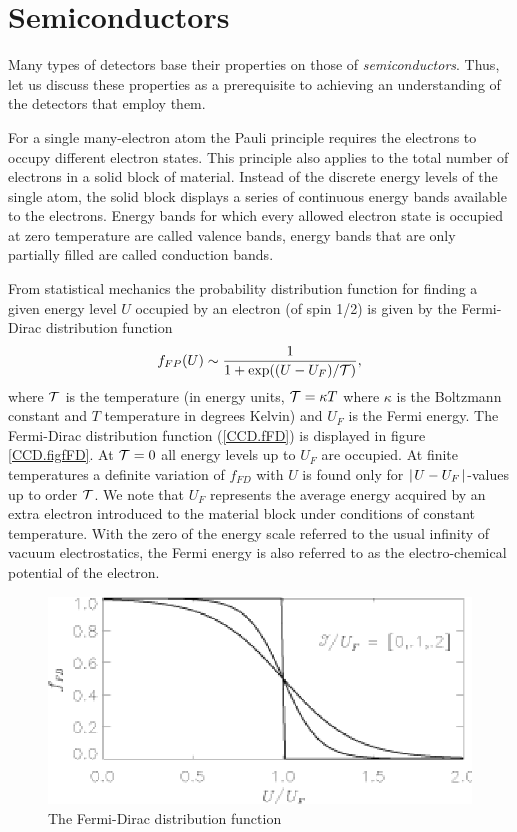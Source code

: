 \section{Semiconductors}

Many types of detectors base their properties on those of {\it
  semiconductors}. Thus, let us discuss these properties as a
prerequisite to achieving an understanding of the detectors that
employ them. 

For a single many-electron atom the Pauli principle requires the
electrons to occupy different electron states. This principle also
applies to the total number of electrons in a solid block of
material. Instead of the discrete energy levels of the single atom,
the solid block displays a series of continuous energy bands available
to the electrons. Energy bands for which every allowed electron state
is occupied at zero temperature are called valence bands, energy bands
that are only partially filled are called conduction bands. 

From statistical mechanics the probability distribution function for
finding a given energy level $U$ occupied by an electron (of spin 1/2)
is given by the Fermi-Dirac distribution function
\begin{equation}
  f_{FP}(U) \sim \frac{1}{1+\exp((U-U_F)/{\cal T})},
  \label{CCD.fFD}
\end{equation}
where ${\cal T}$ is the temperature (in energy units, ${\cal T} = \kappa T$
where $\kappa$ is the Boltzmann constant and $T$ temperature in
degrees Kelvin) and $U_F$ is the Fermi energy. The Fermi-Dirac
distribution function (\ref{CCD.fFD}) is displayed in figure
\ref{CCD.figfFD}. At ${\cal T} = 0$ all energy levels up to $U_F$ are
occupied. At finite temperatures a definite variation of $f_{FD}$ with
$U$ is found only for $\mid\! U - U_F \!\mid$-values up to order ${\cal T}$. We note that $U_F$ represents the average energy acquired by an
extra electron introduced to the material block under conditions of
constant temperature. With the zero of the energy scale referred to the
usual infinity of vacuum electrostatics, the Fermi energy is also
referred to as the electro-chemical potential of the electron.

\begin{figure}[h]
  \centering
	\includegraphics{CCD_fFD.eps}
  \caption{The Fermi-Dirac distribution function}
  \label{fig:CCD.figfFD}
\end{figure}

